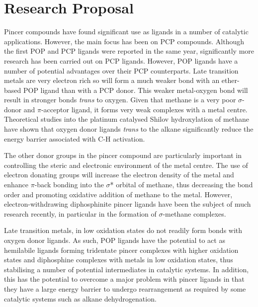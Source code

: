 
\chapter{Research Proposal}
\label{ch:proposal}

Pincer compounds have found significant use as ligands in a number of catalytic applications.  However, the main focus has been on PCP compounds.  Although the first POP and PCP ligands were reported in the same year,\cite{Moulton1976, Alcock1976} significantly more research has been carried out on PCP ligands.  However, POP ligands have a number of potential advantages over their PCP counterparts.  Late transition metals are very electron rich so will form a much weaker bond with an ether-based POP ligand than with a PCP donor.\cite{Zhu2008}  This weaker metal-oxygen bond will result in stronger bonds \emph{trans} to oxygen.  Given that methane is a very poor $\sigma$-donor and $\pi$-acceptor ligand, it forms very weak complexes with a metal centre.\cite{Crabtree2001}  Theoretical studies into the platinum catalysed Shilov hydroxylation of methane have shown that oxygen donor ligands \emph{trans} to the alkane significantly reduce the energy barrier associated with C-H activation.\cite{Zhu2009} 


The other donor groups in the pincer compound are particularly important in controlling the steric and electronic environment of the metal centre.\cite{Choi2011}  The use of electron donating groups will increase the electron density of the metal and enhance $\pi$-back bonding into the $\sigma$* orbital of methane, thus decreasing the bond order and promoting oxidative addition of methane to the metal.\cite{Crabtree2001}  However, electron-withdrawing diphosphinite pincer ligands have been the subject of much research recently, in particular in the formation of $\sigma$-methane complexes.\cite{Bernskoetter2009}

Late transition metals, in low oxidation states do not readily form bonds with oxygen donor ligands.\cite{Davies1981}  As such, POP ligands have the potential to act as hemilabile ligands forming tridentate pincer complexes with higher oxidation states and diphosphine complexes with metals in low oxidation states, thus stabilising a number of potential intermediates in catalytic systems.\cite{Moxham2006, Moxham2008}  In addition, this has the potential to overcome a major problem with pincer ligands in that they have a large energy barrier to undergo rearrangement as required by some catalytic systems such as alkane dehydrogenation.\cite{Wang1996}

